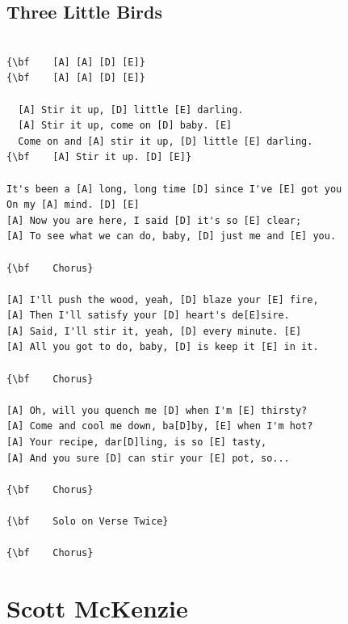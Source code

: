 \documentclass[a4paper]{article}
\begin{document}
\subsection{Three Little Birds}
\begin{Verbatim}[commandchars=\\\{\}]

{\bf    [A] [A] [D] [E]}
{\bf    [A] [A] [D] [E]}

  [A] Stir it up, [D] little [E] darling.
  [A] Stir it up, come on [D] baby. [E]
  Come on and [A] stir it up, [D] little [E] darling.
{\bf    [A] Stir it up. [D] [E]}

It's been a [A] long, long time [D] since I've [E] got you
On my [A] mind. [D] [E]
[A] Now you are here, I said [D] it's so [E] clear;
[A] To see what we can do, baby, [D] just me and [E] you.

{\bf    Chorus}

[A] I'll push the wood, yeah, [D] blaze your [E] fire,
[A] Then I'll satisfy your [D] heart's de[E]sire.
[A] Said, I'll stir it, yeah, [D] every minute. [E]
[A] All you got to do, baby, [D] is keep it [E] in it.

{\bf    Chorus}

[A] Oh, will you quench me [D] when I'm [E] thirsty?
[A] Come and cool me down, ba[D]by, [E] when I'm hot?
[A] Your recipe, dar[D]ling, is so [E] tasty,
[A] And you sure [D] can stir your [E] pot, so...

{\bf    Chorus}

{\bf    Solo on Verse Twice}

{\bf    Chorus}

\end{Verbatim}
\newpage
\section{Scott McKenzie}
\end{document}
